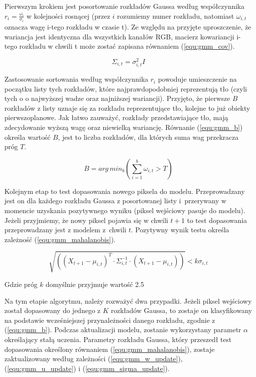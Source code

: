 Pierwszym krokiem jest posortowanie rozkładów Gaussa według współczynnika $r_i = \frac{\omega_i}{\sigma_i}$ w kolejności rosnącej (przez $i$ rozumiemy numer rozkładu, natomiast $\omega_{i,t}$ oznacza wagę i-tego rozkładu w czasie t). Ze względu na przyjęte uproszczenie, że wariancja jest identyczna dla wszystkich kanałów RGB, macierz kowariancji i-tego rozkładu w chwili t może zostać zapisana równaniem (\ref{equ:gmm_cov}).

    \begin{equation}
        \Sigma_{i,t} = \sigma_{i,t}^2 I
    \label{equ:gmm_cov}
    \end{equation}

Zastosowanie sortowania według współczynnika $r_i$ powoduje umieszczenie na początku listy tych rozkładów, które najprawdopodobniej reprezentują tło (czyli tych o o najwyższej wadze oraz najniższej wariancji). Przyjęto, że pierwsze $B$ rozkładów z listy uznaje się za rozkładu reprezentujące tło, kolejne to już obiekty pierwszoplanowe. Jak łatwo zauważyć, rozkłady przedstawiające tło, mają zdecydowanie wyższą wagę oraz niewielką wariancję. Równanie (\ref{equ:gmm_b}) określa wartość $B$, jest to liczba rozkładów, dla których suma wag przekracza próg $T$.


    \begin{equation}
        B = arg\,min_b \left(\sum_{i=1}^{b} \omega_{i,t} > T\right)
    \label{equ:gmm_b}
    \end{equation}

Kolejnym etap to test dopasowania nowego piksela do modelu. Przeprowadzany jest on dla każdego rozkładu Gaussa z posortowanej listy i~przerywany w momencie uzyskania pozytywnego wyniku (piksel wejściowy pasuje do modelu). Jeżeli przyjmiemy, że nowy piksel pojawia się w chwili $t+1$ to test dopasowania przeprowadzany jest z modelem z~chwili $t$. Pozytywny wynik testu określa zależność (\ref{equ:gmm_mahalanobis}).

    \begin{equation}
        \sqrt{ \left( \left( X_{t+1} - \mu_{i,t} \right)^T \cdot \Sigma_{i,t}^{-1} \cdot \left( X_{t+1} - \mu_{i,t} \right) \right)} < k \sigma_{i,t}
    \label{equ:gmm_mahalanobis}
    \end{equation}

\noindent Gdzie próg $k$ domyślnie przyjmuje wartość \num{2.5}


Na tym etapie algorytmu, należy rozważyć dwa przypadki. Jeżeli piksel wejściowy został dopasowany do jednego z $K$ rozkładów Gaussa, to zostaje on klasyfikowany na podstawie wcześniejszej przynależności danego rozkładu, zgodnie z (\ref{equ:gmm_b}). Podczas aktualizacji modelu, zostanie wykorzystany parametr $\alpha$ określający stałą uczenia. Parametry rozkładu Gaussa, który przeszedł test dopasowania określony równaniem (\ref{equ:gmm_mahalanobis}), zostaje zaktualizowany według zależności (\ref{equ:gmm_w_update}), (\ref{equ:gmm_u_update}) i (\ref{equ:gmm_sigma_update}).

